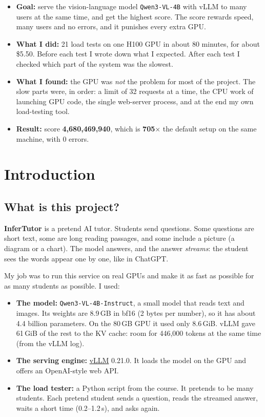 \documentclass[10pt,a4paper]{article}
\begin{document}
\begin{keybox}
\begin{itemize}
  \item \textbf{Goal:} serve the vision-language model \texttt{Qwen3-VL-4B} with vLLM to many users at the same time, and get the highest score. The score rewards speed, many users and no errors, and it punishes every extra GPU.
  \item \textbf{What I did:} 21 load tests on one H100 GPU in about 80 minutes, for about \$5.50. Before each test I wrote down what I expected. After each test I checked which part of the system was the slowest.
  \item \textbf{What I found:} the GPU was \emph{not} the problem for most of the project. The slow parts were, in order: a limit of 32 requests at a time, the CPU work of launching GPU code, the single web-server process, and at the end my own load-testing tool.
  \item \textbf{Result:} score \textbf{4,680,469,940}, which is \textbf{705$\times$} the default setup on the same machine, with 0 errors.
\end{itemize}
\end{keybox}

\section{Introduction}
\subsection{What is this project?}
\textbf{InferTutor} is a pretend AI tutor. Students send questions. Some questions are short text, some are long reading passages, and some include a picture (a diagram or a chart). The model answers, and the answer \emph{streams}: the student sees the words appear one by one, like in ChatGPT.

My job was to run this service on real GPUs and make it as fast as possible for as many students as possible. I used:
\begin{itemize}
  \item \textbf{The model:} \texttt{Qwen3-VL-4B-Instruct}, a small model that reads text and images. Its weights are 8.9\,GB in bf16 (2 bytes per number), so it has about 4.4 billion parameters. On the 80\,GB GPU it used only 8.6\,GiB. vLLM gave 61\,GiB of the rest to the KV cache: room for 446,000 tokens at the same time (from the vLLM log).
  \item \textbf{The serving engine:} \href{https://github.com/vllm-project/vllm}{vLLM} 0.21.0. It loads the model on the GPU and offers an OpenAI-style web API.
  \item \textbf{The load tester:} a Python script from the course. It pretends to be many students. Each pretend student sends a question, reads the streamed answer, waits a short time (0.2--1.2\,s), and asks again.
\end{itemize}
\end{document}
